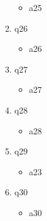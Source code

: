\documentclass{exam}
\begin{document}
\begin{enumerate}
\begin{itemize}
\item a25
\end{itemize}
\item q26
\begin{itemize}
\item a26
\end{itemize}
\item q27
\begin{itemize}
\item a27
\end{itemize}
\item q28
\begin{itemize}
\item a28
\end{itemize}
\item q29
\begin{itemize}
\item a23
\end{itemize}
\item q30
\begin{itemize}
\item a30
\end{itemize}
\end{enumerate}
\end{document}
